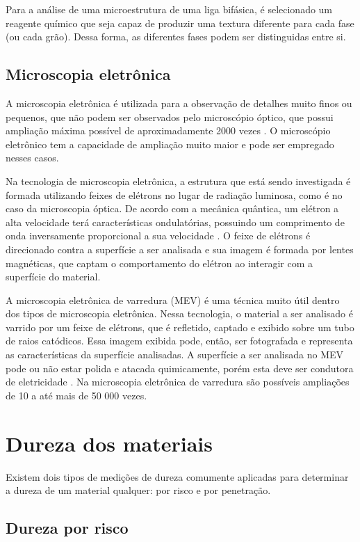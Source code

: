 \documentclass[
12pt,
openany, %
oneside, %
a4paper,			
english,			
brazil			        %
]{abntbibufjf}
\begin{document}
	Para a análise de uma microestrutura de uma liga bifásica, é selecionado um reagente químico que seja capaz de produzir uma textura diferente para cada fase (ou cada grão). Dessa forma, as diferentes fases podem ser distinguidas entre si.
	
\subsection{Microscopia eletrônica}
	A microscopia eletrônica é utilizada para a observação de detalhes muito finos ou pequenos, que não podem ser observados pelo microscópio óptico, que possui ampliação máxima possível de aproximadamente 2000 vezes \cite{callister2011materials}. O microscópio eletrônico tem a capacidade de ampliação muito maior e pode ser empregado nesses casos.
	
	Na tecnologia de microscopia eletrônica, a estrutura que está sendo investigada é formada utilizando feixes de elétrons no lugar de radiação luminosa, como é no caso da microscopia óptica. 
	De acordo com a mecânica quântica, um elétron a alta velocidade terá características ondulatórias, possuindo um comprimento de onda inversamente proporcional a sua velocidade \cite{callister2011materials}. O feixe de elétrons é direcionado contra a superfície a ser analisada e sua imagem é formada por lentes magnéticas, que captam o comportamento do elétron ao interagir com a superfície do material.
	
	A microscopia eletrônica de varredura (MEV) é uma técnica muito útil dentro dos tipos de microscopia eletrônica. Nessa tecnologia, o material a ser analisado é varrido por um feixe de elétrons, que é refletido, captado e exibido sobre um tubo de raios catódicos. Essa imagem exibida pode, então, ser fotografada e representa as características da superfície analisadas. A superfície a ser analisada no MEV pode ou não estar polida e atacada quimicamente, porém esta deve ser condutora de eletricidade \cite{callister2011materials}. Na microscopia eletrônica de varredura são possíveis ampliações de 10 a até mais de 50 000 vezes.


\section{Dureza dos materiais} 

	Existem dois tipos de medições de dureza comumente aplicadas para determinar a dureza de um material qualquer: por risco e por penetração.

\subsection{Dureza por risco}
\end{document}
